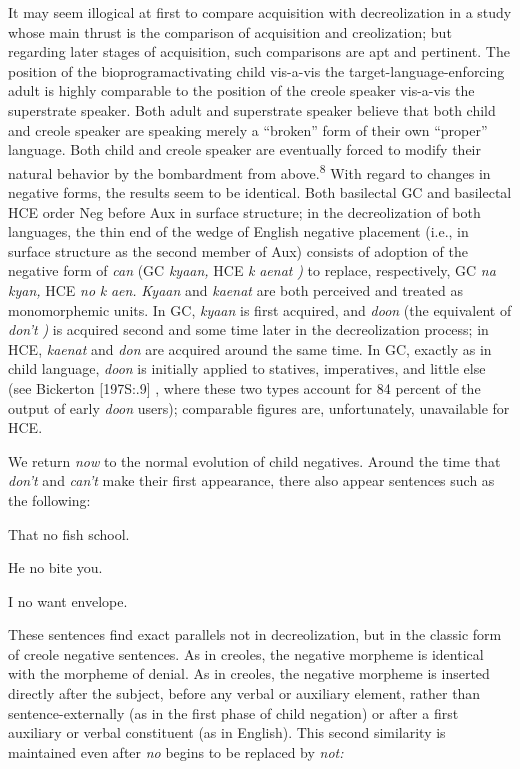 It may seem illogical at first to compare acquisition with de\-creolization in a study whose main thrust is the comparison of acquisi\-tion and creolization; but regarding later stages of acquisition, such comparisons are apt and pertinent. The position of the bioprogram\-activating child vis-a-vis the target-language-enforcing adult is highly comparable to the position of the creole speaker vis-a-vis the super\-strate speaker. Both adult and superstrate speaker believe that both child and creole speaker are speaking merely a ``broken'' form of their own ``proper'' language. Both child and creole speaker are eventually forced to modify their natural behavior by the bombardment from above.\textsuperscript{8} With regard to changes in negative forms, the results seem to be identical. Both basilectal GC and basilectal HCE order Neg
before Aux in surface structure; in the decreolization of both languages, the thin end of the wedge of English negative placement (i.e., in surface structure as the second member of Aux) consists of adoption of the negative form of \textit{can} (GC \textit{kyaan,} HCE \textit{k} \textit{aenat} \textit{)} to replace, respectively, GC \textit{na} \textit{kyan,} HCE \textit{no} \textit{k} \textit{aen.} \textit{Kyaan} and \textit{kaenat} are both perceived and treated as monomorphemic units. In GC, \textit{kyaan} is first acquired, and \textit{doon} (the equivalent of \textit{don't} \textit{)} is acquired second and some time later in the decreolization process; in HCE, \textit{kaenat} and \textit{don} are acquired around the same time. In GC, exactly as in child language, \textit{doon} is initially applied to statives, imperatives, and little else (see Bickerton [197S:.9] , where these two types account for 84 percent of the output of early \textit{doon} users); comparable figures are, unfortunately, unavailable for HCE.

We return \textit{now} to the normal evolution of child negatives. Around the time that \textit{don't} and \textit{can't} make their first appearance, there also appear sentences such as the following:

\ea\label{ex:58}
 That no fish school.
\glt
\z

\ea\label{ex:59}
 He no bite you.
\glt
\z

\ea\label{ex:60}
 I no want envelope.
\glt
\z

These sentences find exact parallels not in decreolization, but in the classic form of creole negative sentences. As in creoles, the negative morpheme is identical with the morpheme of denial. As in creoles, the negative morpheme is inserted directly after the subject, before any verbal or auxiliary element, rather than sentence-externally (as in the first phase of child negation) or after a first auxiliary or verbal constituent (as in English). This second similarity is maintained even after \textit{no} begins to be replaced by \textit{not:}

